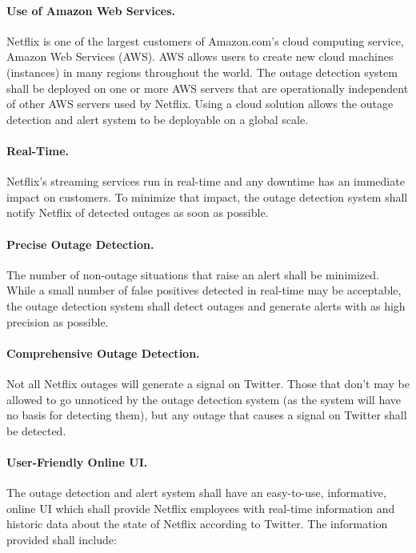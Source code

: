 \documentclass[12pt]{ucthesis}
\begin{document}
\paragraph{Use of Amazon Web Services.}
Netflix is one of the largest customers of Amazon.com's cloud computing
service, Amazon Web Services (AWS). AWS allows users to create new cloud
machines (instances) in many regions throughout the world. The outage
detection system shall be deployed on one or more AWS servers that are
operationally independent of other AWS servers used by Netflix. Using a cloud
solution allows the outage detection and alert system to be deployable on a
global scale.

\paragraph{Real-Time.}
Netflix's streaming services run in real-time and any downtime has an immediate
impact on customers. To minimize that impact, the outage detection system shall notify
Netflix of detected outages as soon as possible.

\paragraph{Precise Outage Detection.}
The number of non-outage situations that raise an alert shall be minimized.
While a small number of false positives detected in real-time may be acceptable,
the outage detection system shall detect outages and generate alerts with as
high precision as possible.

\paragraph{Comprehensive Outage Detection.}
Not all Netflix outages will generate a signal on Twitter. Those that don't may
be allowed to go unnoticed by the outage detection system (as the system will
have no basis for detecting them), but any outage that causes a signal on
Twitter shall be detected.

\paragraph{User-Friendly Online UI.}
The outage detection and alert system shall have an easy-to-use, informative,
online UI which shall provide Netflix employees with real-time information and
historic data about the state of Netflix according to Twitter. The information
provided shall include:
\end{document}
